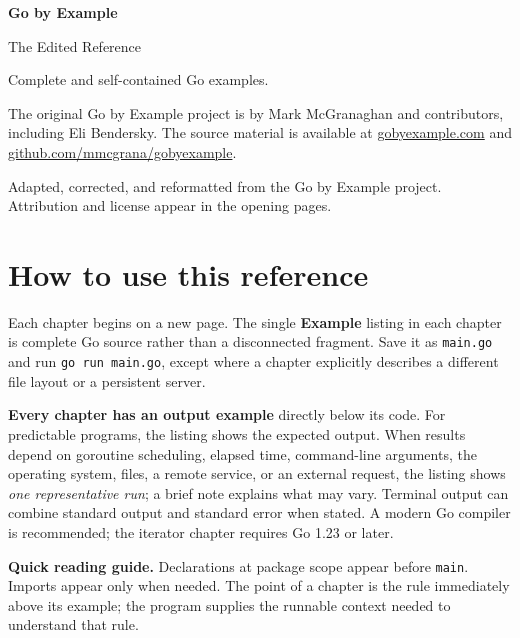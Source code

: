 \documentclass[10pt,oneside]{article}
\newcommand{\sectionline}{\par\vspace{4pt}{\color{rule}\hrule height .5pt}\vspace{7pt}\color{ink}\noindent}
\begin{document}
\color{ink}
\begin{titlepage}
\thispagestyle{empty}
\vspace*{1.0in}
{\sffamily\Huge\bfseries\color{ink}Go by Example\par}
\vspace{16pt}
{\sffamily\LARGE\color{accent}The Edited Reference\par}
\vspace{25pt}
\sectionline
\vspace{12pt}
{\Large\color{ink}Complete and self-contained Go examples.\par}
\vspace{16pt}
{\large\raggedright The original Go by Example project is by Mark McGranaghan and contributors, including Eli Bendersky. The source material is available at \href{https://gobyexample.com}{gobyexample.com} and \href{https://github.com/mmcgrana/gobyexample}{github.com/mmcgrana/gobyexample}.\par}
\vfill
{\sffamily\small\color{muted}Adapted, corrected, and reformatted from the Go by Example project.\\Attribution and license appear in the opening pages.\par}
\end{titlepage}
\tableofcontents
\clearpage
\section*{How to use this reference}
Each chapter begins on a new page. The single \textbf{Example} listing in each chapter is complete Go source rather than a disconnected fragment. Save it as \texttt{main.go} and run \texttt{go run main.go}, except where a chapter explicitly describes a different file layout or a persistent server.

\textbf{Every chapter has an output example} directly below its code. For predictable programs, the listing shows the expected output. When results depend on goroutine scheduling, elapsed time, command-line arguments, the operating system, files, a remote service, or an external request, the listing shows \emph{one representative run}; a brief note explains what may vary. Terminal output can combine standard output and standard error when stated. A modern Go compiler is recommended; the iterator chapter requires Go 1.23 or later.

\textbf{Quick reading guide.} Declarations at package scope appear before \texttt{main}. Imports appear only when needed. The point of a chapter is the rule immediately above its example; the program supplies the runnable context needed to understand that rule.
\clearpage
\end{document}
